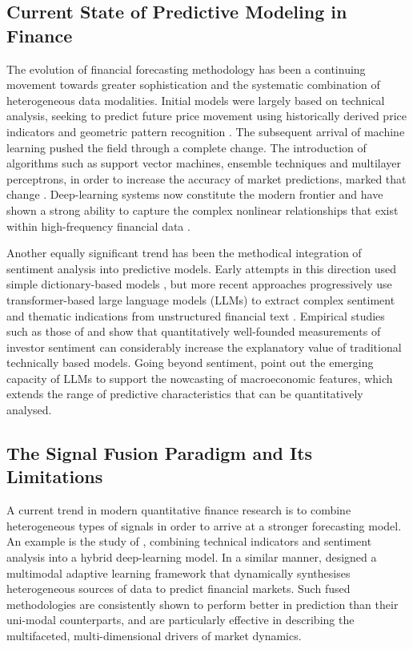 \documentclass{singlecol-new}
\theoremstyle{TH}{
\newtheorem{lemma}{Lemma}
\newtheorem{theorem}[lemma]{Theorem}
\newtheorem{corrolary}[lemma]{Corrolary}
\newtheorem{conjecture}[lemma]{Conjecture}
\newtheorem{proposition}[lemma]{Proposition}
\newtheorem{claim}[lemma]{Claim}
\newtheorem{stheorem}[lemma]{Wrong Theorem}
\newtheorem{algorithm}{Algorithm}
}
\theoremstyle{THrm}{
\newtheorem{definition}{Definition}[section]
\newtheorem{question}{Question}[section]
\newtheorem{remark}{Remark}
\newtheorem{scheme}{Scheme}
}
\theoremstyle{THhit}{
\newtheorem{case}{Case}[section]
}
\begin{document}
\subsection{Current State of Predictive Modeling in Finance}

The evolution of financial forecasting methodology has been a continuing movement
towards greater sophistication and the systematic combination of heterogeneous data
modalities. Initial models were largely based on technical analysis, seeking to predict
future price movement using historically derived price indicators and geometric pattern
recognition \citep{lee07}. The subsequent arrival of machine learning pushed the field
through a complete change. The introduction of algorithms such as support vector
machines, ensemble techniques and multilayer perceptrons, in order to increase the
accuracy of market predictions, marked that change \citep{chou18,liu19}. Deep-learning
systems now constitute the modern frontier and have shown a strong ability to capture
the complex nonlinear relationships that exist within high-frequency financial data
\citep{nayak22}.

Another equally significant trend has been the methodical integration of sentiment
analysis into predictive models. Early attempts in this direction used simple
dictionary-based models \citep{loughran11}, but more recent approaches progressively use
transformer-based large language models (LLMs) to extract complex sentiment and thematic
indications from unstructured financial text \citep{jung24,liu24}. Empirical studies such
as those of \citet{mu23} and \citet{bacco24} show that quantitatively well-founded
measurements of investor sentiment can considerably increase the explanatory value of
traditional technically based models. Going beyond sentiment, \citet{onozo24} point out
the emerging capacity of LLMs to support the nowcasting of macroeconomic features, which
extends the range of predictive characteristics that can be quantitatively analysed.

\subsection{The Signal Fusion Paradigm and Its Limitations}

A current trend in modern quantitative finance research is to combine heterogeneous
types of signals in order to arrive at a stronger forecasting model. An example is the
study of \citet{moodi24}, combining technical indicators and sentiment analysis into a
hybrid deep-learning model. In a similar manner, \citet{farimani24} designed a multimodal
adaptive learning framework that dynamically synthesises heterogeneous sources of data to
predict financial markets. Such fused methodologies are consistently shown to perform
better in prediction than their uni-modal counterparts, and are particularly effective in
describing the multifaceted, multi-dimensional drivers of market dynamics.
\end{document}
